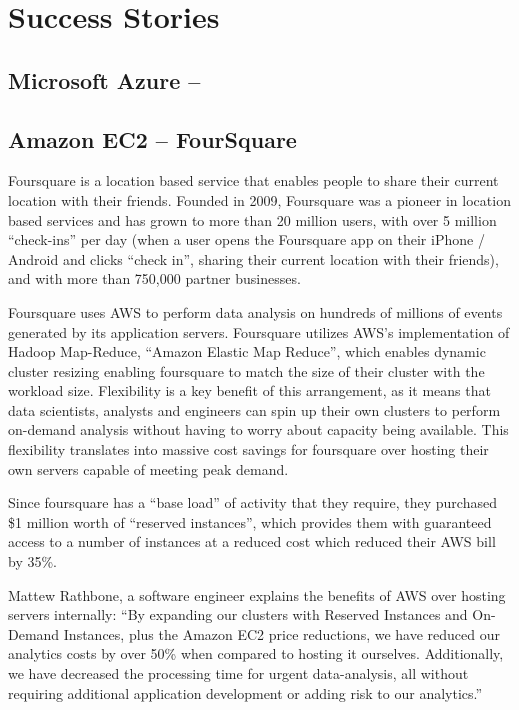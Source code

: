 \chapter{Success Stories}
\section{Microsoft Azure -- }

\section{Amazon EC2 -- FourSquare}
Foursquare is a location based service that enables people to share their current location with their friends.  Founded in 2009, Foursquare was a pioneer in location based services and has grown to more than 20 million users, with over 5 million ``check-ins'' per day (when a user opens the Foursquare app on their iPhone / Android and clicks ``check in'', sharing their current location with their friends), and with more than 750,000 partner businesses\ftSAmOne.

Foursquare uses AWS to perform data analysis on hundreds of millions of events generated by its application servers.  Foursquare utilizes AWS’s implementation of Hadoop Map-Reduce, ``Amazon Elastic Map Reduce'', which enables dynamic cluster resizing enabling foursquare to match the size of their cluster with the workload size.  Flexibility is a key benefit of this arrangement, as it means that data scientists, analysts and engineers can spin up their own clusters to perform on-demand analysis without having to worry about capacity being available.  This flexibility translates into massive cost savings for foursquare over hosting their own servers capable of meeting peak demand.

Since foursquare has a ``base load'' of activity that they require, they purchased \$1 million worth of ``reserved instances'', which provides them with guaranteed access to a number of instances at a reduced cost which reduced their AWS bill by 35\%.  

Mattew Rathbone, a software engineer explains the benefits of AWS over hosting servers internally: ``By expanding our clusters with Reserved Instances and On-Demand Instances, plus the Amazon EC2 price reductions, we have reduced our analytics costs by over 50\% when compared to hosting it ourselves. Additionally, we have decreased the processing time for urgent data-analysis, all without requiring additional application development or adding risk to our analytics.''\ftSAmTwo

